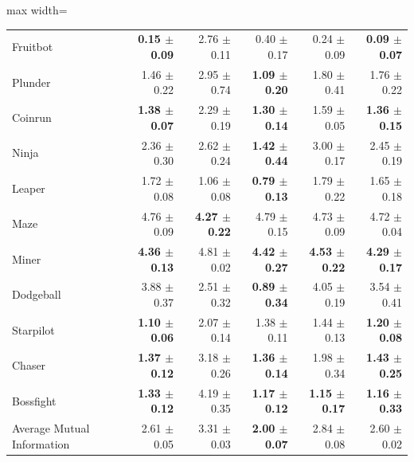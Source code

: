 \begin{table}[!htb]
\begin{center}
\begin{small}
\begin{sc}
\begin{adjustbox}{max width=\linewidth}
\begin{tabular}{lrrrrr}
                  Fruitbot & \textbf{0.15 $\pm$ 0.09} &          2.76 $\pm$ 0.11 &          0.40 $\pm$ 0.17 &                   0.24 $\pm$ 0.09 &          \textbf{0.09 $\pm$ 0.07} \\
                   Plunder &          1.46 $\pm$ 0.22 &          2.95 $\pm$ 0.74 & \textbf{1.09 $\pm$ 0.20} &                   1.80 $\pm$ 0.41 &                   1.76 $\pm$ 0.22 \\
                   Coinrun & \textbf{1.38 $\pm$ 0.07} &          2.29 $\pm$ 0.19 & \textbf{1.30 $\pm$ 0.14} &                   1.59 $\pm$ 0.05 &          \textbf{1.36 $\pm$ 0.15} \\
                     Ninja &          2.36 $\pm$ 0.30 &          2.62 $\pm$ 0.24 & \textbf{1.42 $\pm$ 0.44} &                   3.00 $\pm$ 0.17 &                   2.45 $\pm$ 0.19 \\
                    Leaper &          1.72 $\pm$ 0.08 &          1.06 $\pm$ 0.08 & \textbf{0.79 $\pm$ 0.13} &                   1.79 $\pm$ 0.22 &                   1.65 $\pm$ 0.18 \\
                      Maze &          4.76 $\pm$ 0.09 & \textbf{4.27 $\pm$ 0.22} &          4.79 $\pm$ 0.15 &                   4.73 $\pm$ 0.09 &                   4.72 $\pm$ 0.04 \\
                     Miner & \textbf{4.36 $\pm$ 0.13} &          4.81 $\pm$ 0.02 & \textbf{4.42 $\pm$ 0.27} &          \textbf{4.53 $\pm$ 0.22} &          \textbf{4.29 $\pm$ 0.17} \\
                 Dodgeball &          3.88 $\pm$ 0.37 &          2.51 $\pm$ 0.32 & \textbf{0.89 $\pm$ 0.34} &                   4.05 $\pm$ 0.19 &                   3.54 $\pm$ 0.41 \\
                 Starpilot & \textbf{1.10 $\pm$ 0.06} &          2.07 $\pm$ 0.14 &          1.38 $\pm$ 0.11 &                   1.44 $\pm$ 0.13 &          \textbf{1.20 $\pm$ 0.08} \\
                    Chaser & \textbf{1.37 $\pm$ 0.12} &          3.18 $\pm$ 0.26 & \textbf{1.36 $\pm$ 0.14} &                   1.98 $\pm$ 0.34 &          \textbf{1.43 $\pm$ 0.25} \\
                 Bossfight & \textbf{1.33 $\pm$ 0.12} &          4.19 $\pm$ 0.35 & \textbf{1.17 $\pm$ 0.12} &          \textbf{1.15 $\pm$ 0.17} &          \textbf{1.16 $\pm$ 0.33} \\
\midrule
Average Mutual Information &          2.61 $\pm$ 0.05 &          3.31 $\pm$ 0.03 & \textbf{2.00 $\pm$ 0.07} &                   2.84 $\pm$ 0.08 &                   2.60 $\pm$ 0.02 \\
\bottomrule
\end{tabular}
\end{adjustbox}
\end{sc}
\end{small}
\end{center}
\vskip -0.1in
\end{table}

